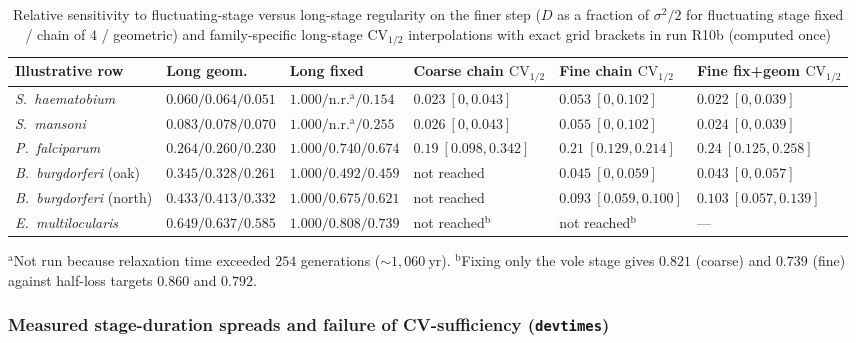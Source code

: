 \begin{table}[htbp]\centering\scriptsize
\setlength{\tabcolsep}{2.5pt}
\caption{Relative sensitivity to fluctuating-stage versus long-stage regularity on the finer step ($D$ as a fraction of $\sigma^2/2$ for fluctuating stage fixed / chain of $4$ / geometric) and family-specific long-stage $\mathrm{CV}_{1/2}$ interpolations with exact grid brackets in run R10b (computed once)}\label{num-esm-tab-r10b-b}
\begin{tabular}{lll|lll}\toprule
Illustrative row & Long geom. & Long fixed & Coarse chain $\mathrm{CV}_{1/2}$ & Fine chain $\mathrm{CV}_{1/2}$ & Fine fix+geom $\mathrm{CV}_{1/2}$\\\midrule
\emph{S.~haematobium} & $0.060 / 0.064 / 0.051$ & $1.000 / \text{n.r.}^{\mathrm{a}} / 0.154$ & $0.023\ [0, 0.043]$ & $0.053\ [0, 0.102]$ & $0.022\ [0, 0.039]$\\
\emph{S.~mansoni} & $0.083 / 0.078 / 0.070$ & $1.000 / \text{n.r.}^{\mathrm{a}} / 0.255$ & $0.026\ [0, 0.043]$ & $0.055\ [0, 0.102]$ & $0.024\ [0, 0.039]$\\
\emph{P.~falciparum} & $0.264 / 0.260 / 0.230$ & $1.000 / 0.740 / 0.674$ & $0.19\ [0.098, 0.342]$ & $0.21\ [0.129, 0.214]$ & $0.24\ [0.125, 0.258]$\\
\emph{B.~burgdorferi} (oak) & $0.345 / 0.328 / 0.261$ & $1.000 / 0.492 / 0.459$ & not reached & $0.045\ [0, 0.059]$ & $0.043\ [0, 0.057]$\\
\emph{B.~burgdorferi} (north) & $0.433 / 0.413 / 0.332$ & $1.000 / 0.675 / 0.621$ & not reached & $0.093\ [0.059, 0.100]$ & $0.103\ [0.057, 0.139]$\\
\emph{E.~multilocularis} & $0.649 / 0.637 / 0.585$ & $1.000 / 0.808 / 0.739$ & not reached$^{\mathrm{b}}$ & not reached$^{\mathrm{b}}$ & ---\\\bottomrule
\end{tabular}
\par\smallskip\raggedright\footnotesize
$^{\mathrm{a}}$Not run because relaxation time exceeded $254$ generations ($\sim 1{,}060\ \mathrm{yr}$). $^{\mathrm{b}}$Fixing only the vole stage gives $0.821$ (coarse) and $0.739$ (fine) against half-loss targets $0.860$ and $0.792$.
\end{table}

\subsubsection{Measured stage-duration spreads and failure of CV-sufficiency (\texttt{devtimes})}\label{num-esm-devtimes}


